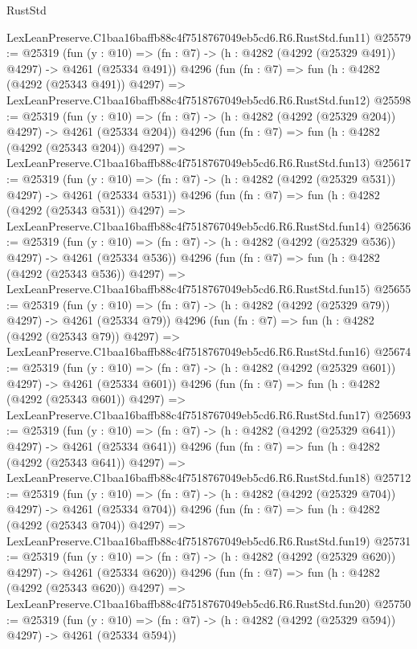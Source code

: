 \begin{lexlean}{RustStd}
\begin{coremodule}
    LexLeanPreserve.C1baa16baffb88c4f7518767049eb5cd6.R6.RustStd.fun11)
@25579 := @25319
    (fun (y : @10) => (fn : @7) -> (h : @4282 (@4292 (@25329 @491)) @4297) -> @4261 (@25334 @491))
    @4296
    (fun (fn : @7) =>
    fun (h : @4282 (@4292 (@25343 @491)) @4297) =>
    LexLeanPreserve.C1baa16baffb88c4f7518767049eb5cd6.R6.RustStd.fun12)
@25598 := @25319
    (fun (y : @10) => (fn : @7) -> (h : @4282 (@4292 (@25329 @204)) @4297) -> @4261 (@25334 @204))
    @4296
    (fun (fn : @7) =>
    fun (h : @4282 (@4292 (@25343 @204)) @4297) =>
    LexLeanPreserve.C1baa16baffb88c4f7518767049eb5cd6.R6.RustStd.fun13)
@25617 := @25319
    (fun (y : @10) => (fn : @7) -> (h : @4282 (@4292 (@25329 @531)) @4297) -> @4261 (@25334 @531))
    @4296
    (fun (fn : @7) =>
    fun (h : @4282 (@4292 (@25343 @531)) @4297) =>
    LexLeanPreserve.C1baa16baffb88c4f7518767049eb5cd6.R6.RustStd.fun14)
@25636 := @25319
    (fun (y : @10) => (fn : @7) -> (h : @4282 (@4292 (@25329 @536)) @4297) -> @4261 (@25334 @536))
    @4296
    (fun (fn : @7) =>
    fun (h : @4282 (@4292 (@25343 @536)) @4297) =>
    LexLeanPreserve.C1baa16baffb88c4f7518767049eb5cd6.R6.RustStd.fun15)
@25655 := @25319
    (fun (y : @10) => (fn : @7) -> (h : @4282 (@4292 (@25329 @79)) @4297) -> @4261 (@25334 @79))
    @4296
    (fun (fn : @7) =>
    fun (h : @4282 (@4292 (@25343 @79)) @4297) =>
    LexLeanPreserve.C1baa16baffb88c4f7518767049eb5cd6.R6.RustStd.fun16)
@25674 := @25319
    (fun (y : @10) => (fn : @7) -> (h : @4282 (@4292 (@25329 @601)) @4297) -> @4261 (@25334 @601))
    @4296
    (fun (fn : @7) =>
    fun (h : @4282 (@4292 (@25343 @601)) @4297) =>
    LexLeanPreserve.C1baa16baffb88c4f7518767049eb5cd6.R6.RustStd.fun17)
@25693 := @25319
    (fun (y : @10) => (fn : @7) -> (h : @4282 (@4292 (@25329 @641)) @4297) -> @4261 (@25334 @641))
    @4296
    (fun (fn : @7) =>
    fun (h : @4282 (@4292 (@25343 @641)) @4297) =>
    LexLeanPreserve.C1baa16baffb88c4f7518767049eb5cd6.R6.RustStd.fun18)
@25712 := @25319
    (fun (y : @10) => (fn : @7) -> (h : @4282 (@4292 (@25329 @704)) @4297) -> @4261 (@25334 @704))
    @4296
    (fun (fn : @7) =>
    fun (h : @4282 (@4292 (@25343 @704)) @4297) =>
    LexLeanPreserve.C1baa16baffb88c4f7518767049eb5cd6.R6.RustStd.fun19)
@25731 := @25319
    (fun (y : @10) => (fn : @7) -> (h : @4282 (@4292 (@25329 @620)) @4297) -> @4261 (@25334 @620))
    @4296
    (fun (fn : @7) =>
    fun (h : @4282 (@4292 (@25343 @620)) @4297) =>
    LexLeanPreserve.C1baa16baffb88c4f7518767049eb5cd6.R6.RustStd.fun20)
@25750 := @25319
    (fun (y : @10) => (fn : @7) -> (h : @4282 (@4292 (@25329 @594)) @4297) -> @4261 (@25334 @594))

\end{coremodule}
\end{lexlean}
